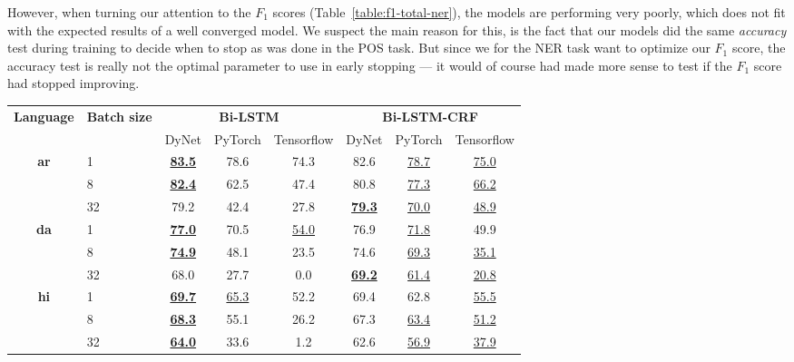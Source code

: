 However, when turning our attention to the $F_{1}$ scores
(Table~\ref{table:f1-total-ner}), the models are performing very poorly, which
does not fit with the expected results of a well converged model. We suspect the
main reason for this, is the fact that our models did the same \textit{accuracy}
test during training to decide when to stop as was done in the POS task. But
since we for the NER task want to optimize our $F_{1}$ score, the accuracy
test is really not the optimal parameter to use in early stopping --- it would
of course had made more sense to test if the $F_{1}$ score had stopped
improving.

\begin{table}[h!]
    \centering
    \begin{tabular}{c l c c c|c c c}
        \toprule
        \multirow{2}{*}{\bfseries Language} &
        \multirow{2}{*}{\bfseries Batch size} &
        \multicolumn{3}{c}{\bfseries Bi-LSTM} &
        \multicolumn{3}{c}{\bfseries Bi-LSTM-CRF} \\
        \cmidrule(lr){3-8}
        && DyNet & PyTorch & Tensorflow & DyNet & PyTorch & Tensorflow \\

        \cmidrule(lr){1-8}
        \multirow{3}{*}{\bfseries ar}
        &  1 & 
        \underline{\textbf{83.5}} & 78.6 & 74.3 &
        82.6 & \underline{78.7} & \underline{75.0} \\
        &  8 & 
        \underline{\textbf{82.4}} & 62.5 & 47.4 &
        80.8 & \underline{77.3} & \underline{66.2} \\
        & 32 & 
        79.2 & 42.4 & 27.8 &
        \underline{\textbf{79.3}} & \underline{70.0} & \underline{48.9} \\

        \cmidrule(lr){1-8}
        \multirow{3}{*}{\bfseries da}
        &  1 &
        \underline{\textbf{77.0}} & 70.5 & \underline{54.0} &
        76.9 & \underline{71.8} & 49.9 \\
        &  8 &
        \underline{\textbf{74.9}} & 48.1 & 23.5 &
        74.6 & \underline{69.3} & \underline{35.1} \\
        & 32 &
        68.0 & 27.7 &  0.0 &
        \underline{\textbf{69.2}} & \underline{61.4} & \underline{20.8} \\

        \cmidrule(lr){1-8}
        \multirow{3}{*}{\bfseries hi}
        &  1 &
        \underline{\textbf{69.7}} & \underline{65.3} & 52.2 &
        69.4 & 62.8 & \underline{55.5} \\
        &  8 &
        \underline{\textbf{68.3}} & 55.1 & 26.2 &
        67.3 & \underline{63.4} & \underline{51.2} \\
        & 32 &
        \underline{\textbf{64.0}} & 33.6 &  1.2 &
        62.6 & \underline{56.9} & \underline{37.9} \\


\end{tabular}
\end{table}
